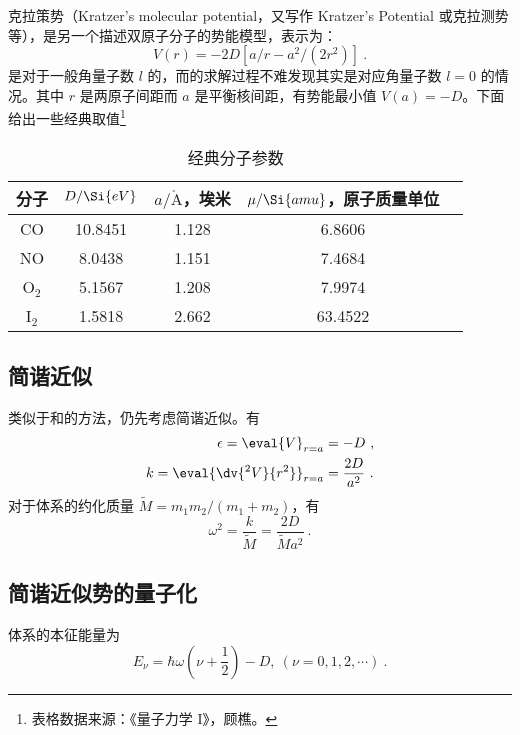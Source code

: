 

克拉策势（Kratzer's molecular potential，又写作 Kratzer's Potential 或克拉测势等），是另一个描述双原子分子的势能模型，表示为：
\begin{equation}
V(r) = -2D [a/r - a^2/(2r^2)] ~.
\end{equation}
是对于一般角量子数 $l$ 的，而的求解过程不难发现其实是对应角量子数 $l=0$ 的情况。其中 $r$ 是两原子间距而 $a$ 是平衡核间距，有势能最小值 $V(a) = -D$。下面给出一些经典取值\footnote{表格数据来源：《量子力学 I》，顾樵。}
\begin{table}[ht]
\centering
\caption{经典分子参数}\label{tab_kratPo1}
\begin{tabular}{|c|c|c|c|c|}
\hline
分子 & $D/\Si{eV}$ & $a/\mathring{\text{A}}$，埃米 & $\mu/\Si{amu}$，原子质量单位\\
\hline
CO & 10.8451 & 1.128 & 6.8606 \\
\hline
NO & 8.0438 & 1.151 & 7.4684 \\
\hline
O$_2$ & 5.1567 & 1.208 & 7.9974 \\
\hline
I$_2$ & 1.5818 & 2.662 & 63.4522 \\
\hline
\end{tabular}
\end{table}

\subsection{简谐近似}
类似于和的方法，仍先考虑简谐近似。有
\begin{equation}
\begin{aligned}
\epsilon = \eval{V}_{r=a} &= -D ~, \\
k = \eval{\dv{^2 V}{r^2}}_{r=a} &= \frac{2D}{a^2} ~.
\end{aligned}
\end{equation}
对于体系的约化质量 $\widetilde M = m_1m_2/(m_1+m_2)$，有
$$\omega^2 = \frac{k}{\widetilde M} = \frac{2D}{\widetilde M a^2} ~.$$

\subsection{简谐近似势的量子化}
体系的本征能量为
\begin{equation}
E_\nu = \hbar \omega\left(\nu + \frac12\right) - D, \ (\nu = 0, 1, 2, \cdots) ~.
\end{equation}

